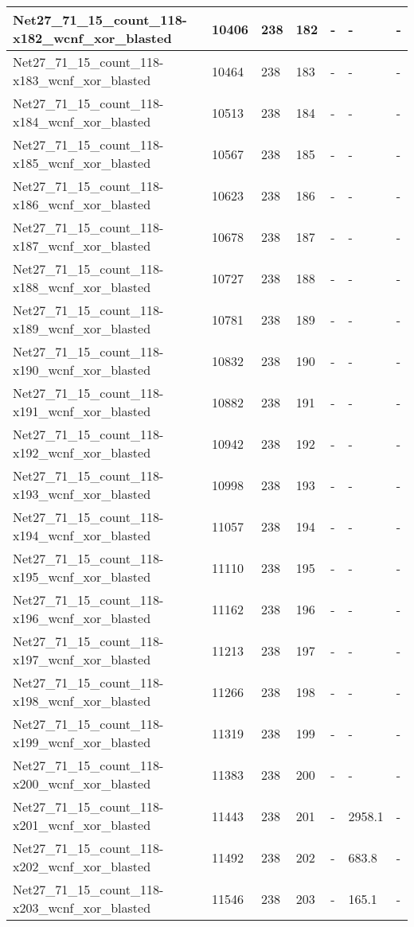 \begin{scriptsize}
\begin{longtable}{|p{5cm}|l|l|l|l|l|l|}
Net27\_71\_15\_count\_118-x182\_wcnf\_xor\_blasted&10406&238&182&-&-&- \\ \hline 
Net27\_71\_15\_count\_118-x183\_wcnf\_xor\_blasted&10464&238&183&-&-&- \\ \hline 
Net27\_71\_15\_count\_118-x184\_wcnf\_xor\_blasted&10513&238&184&-&-&- \\ \hline 
Net27\_71\_15\_count\_118-x185\_wcnf\_xor\_blasted&10567&238&185&-&-&- \\ \hline 
Net27\_71\_15\_count\_118-x186\_wcnf\_xor\_blasted&10623&238&186&-&-&- \\ \hline 
Net27\_71\_15\_count\_118-x187\_wcnf\_xor\_blasted&10678&238&187&-&-&- \\ \hline 
Net27\_71\_15\_count\_118-x188\_wcnf\_xor\_blasted&10727&238&188&-&-&- \\ \hline 
Net27\_71\_15\_count\_118-x189\_wcnf\_xor\_blasted&10781&238&189&-&-&- \\ \hline 
Net27\_71\_15\_count\_118-x190\_wcnf\_xor\_blasted&10832&238&190&-&-&- \\ \hline 
Net27\_71\_15\_count\_118-x191\_wcnf\_xor\_blasted&10882&238&191&-&-&- \\ \hline 
Net27\_71\_15\_count\_118-x192\_wcnf\_xor\_blasted&10942&238&192&-&-&- \\ \hline 
Net27\_71\_15\_count\_118-x193\_wcnf\_xor\_blasted&10998&238&193&-&-&- \\ \hline 
Net27\_71\_15\_count\_118-x194\_wcnf\_xor\_blasted&11057&238&194&-&-&- \\ \hline 
Net27\_71\_15\_count\_118-x195\_wcnf\_xor\_blasted&11110&238&195&-&-&- \\ \hline 
Net27\_71\_15\_count\_118-x196\_wcnf\_xor\_blasted&11162&238&196&-&-&- \\ \hline 
Net27\_71\_15\_count\_118-x197\_wcnf\_xor\_blasted&11213&238&197&-&-&- \\ \hline 
Net27\_71\_15\_count\_118-x198\_wcnf\_xor\_blasted&11266&238&198&-&-&- \\ \hline 
Net27\_71\_15\_count\_118-x199\_wcnf\_xor\_blasted&11319&238&199&-&-&- \\ \hline 
Net27\_71\_15\_count\_118-x200\_wcnf\_xor\_blasted&11383&238&200&-&-&- \\ \hline 
Net27\_71\_15\_count\_118-x201\_wcnf\_xor\_blasted&11443&238&201&-&2958.1&- \\ \hline 
Net27\_71\_15\_count\_118-x202\_wcnf\_xor\_blasted&11492&238&202&-&683.8&- \\ \hline 
Net27\_71\_15\_count\_118-x203\_wcnf\_xor\_blasted&11546&238&203&-&165.1&- \\ \hline 

\end{longtable}
\end{scriptsize}
